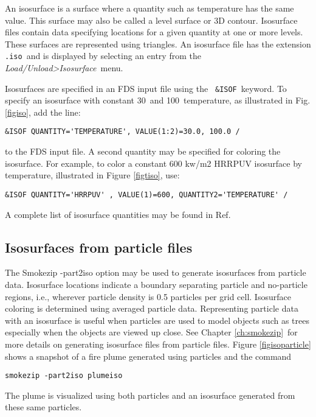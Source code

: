 \documentclass[11pt,twoside]{book}
\begin{document}
An isosurface is a surface where a quantity such as temperature has the same
value. This surface may also be called a
level surface or 3D contour. Isosurface files contain data
specifying locations for a given quantity at one or
more levels. These surfaces are represented using triangles.
An isosurface file has the extension {\tt .iso}\ and is
displayed by selecting an entry from the {\em Load/Unload>Isosurface}\ menu.

Isosurfaces are specified in an FDS input file using the {\tt
\&ISOF}\ keyword.  To specify an isosurface with constant
30\degC\ and 100\degC\ temperature, as illustrated in Fig. \ref{figiso}, add
the line:
\begin{lstlisting}
&ISOF QUANTITY='TEMPERATURE', VALUE(1:2)=30.0, 100.0 /
\end{lstlisting}
to the FDS input file.
A second quantity may be specified for coloring the isosurface.
For example, to color a constant 600 kw/m2 HRRPUV isosurface by temperature,
illustrated in Figure \ref{figtiso},
use:
\begin{lstlisting}
&ISOF QUANTITY='HRRPUV' , VALUE(1)=600, QUANTITY2='TEMPERATURE' /
\end{lstlisting}
A complete list of isosurface quantities
may be found in Ref.~\cite{FDS_Users_Guide}

\subsection{Isosurfaces from particle files}
The Smokezip -part2iso option may be used to generate isosurfaces from particle data.
Isosurface locations indicate a boundary separating particle and
no-particle regions, i.e., wherever particle density is 0.5
particles per grid cell.  Isosurface  coloring is determined using
averaged particle data.  Representing particle data with an
isosurface is useful when particles are used to model objects such
as trees especially when the objects are viewed up close.  See
Chapter \ref{ch:smokezip}\ for more details on generating
isosurface files from particle files.  Figure \ref{figisoparticle}
shows a snapshot of a fire plume generated using particles and the command
\begin{lstlisting}
smokezip -part2iso plumeiso
\end{lstlisting}
The plume is visualized using both particles and an isosurface
generated from these same particles.
\end{document}
